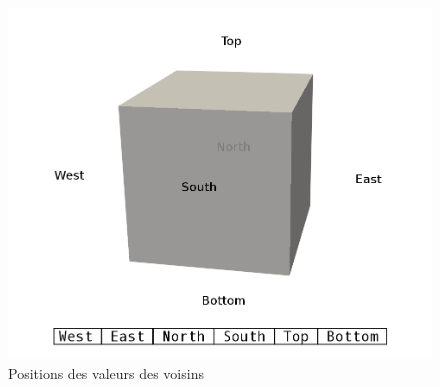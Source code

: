


\begin{figure}[h!]
  \centering
  \includegraphics[scale=0.3]{figures/neighbor_pos.png}
  \caption{\label{fig:neighbor_pos}Positions des valeurs des voisins}
\end{figure}

